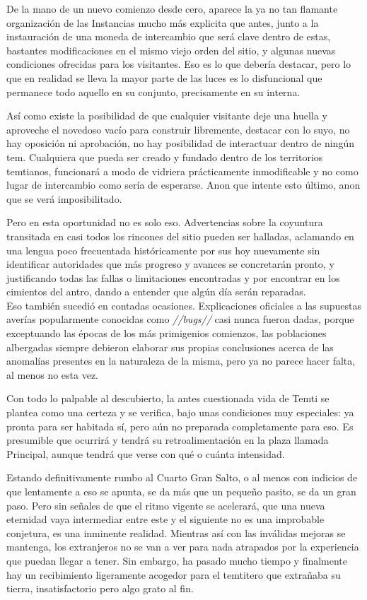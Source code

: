 \documentclass[
  spanish,
]{book}
\begin{document}
De la mano de un nuevo comienzo desde cero, aparece la ya no tan flamante organización de las Instancias mucho más explicita que antes, junto a la instauración de una moneda de intercambio que será clave dentro de estas, bastantes modificaciones en el mismo viejo orden del sitio, y algunas nuevas condiciones ofrecidas para los visitantes. Eso es lo que debería destacar, pero lo que en realidad se lleva la mayor parte de las luces es lo disfuncional que permanece todo aquello en su conjunto, precisamente en su interna.

Así como existe la posibilidad de que cualquier visitante deje una huella y aproveche el novedoso vacío para construir libremente, destacar con lo suyo, no hay oposición ni aprobación, no hay posibilidad de interactuar dentro de ningún tem. Cualquiera que pueda ser creado y fundado dentro de los territorios temtianos, funcionará a modo de vidriera prácticamente inmodificable y no como lugar de intercambio como sería de esperarse. Anon que intente esto último, anon que se verá imposibilitado.

Pero en esta oportunidad no es solo eso. Advertencias sobre la coyuntura transitada en casi todos los rincones del sitio pueden ser halladas, aclamando en una lengua poco frecuentada históricamente por sus hoy nuevamente sin identificar autoridades que más progreso y avances se concretarán pronto, y justificando todas las fallas o limitaciones encontradas y por encontrar en los cimientos del antro, dando a entender que algún día serán reparadas.\\
Eso también sucedió en contadas ocasiones. Explicaciones oficiales a las supuestas averías popularmente conocidas como \emph{//bugs//} casi nunca fueron dadas, porque exceptuando las épocas de los más primigenios comienzos, las poblaciones albergadas siempre debieron elaborar sus propias conclusiones acerca de las anomalías presentes en la naturaleza de la misma, pero ya no parece hacer falta, al menos no esta vez.

Con todo lo palpable al descubierto, la antes cuestionada vida de Temti se plantea como una certeza y se verifica, bajo unas condiciones muy especiales: ya pronta para ser habitada sí, pero aún no preparada completamente para eso. Es presumible que ocurrirá y tendrá su retroalimentación en la plaza llamada Principal, aunque tendrá que verse con qué o cuánta intensidad.

Estando definitivamente rumbo al Cuarto Gran Salto, o al menos con indicios de que lentamente a eso se apunta, se da más que un pequeño pasito, se da un gran paso. Pero sin señales de que el ritmo vigente se acelerará, que una nueva eternidad vaya intermediar entre este y el siguiente no es una improbable conjetura, es una inminente realidad. Mientras así con las inválidas mejoras se mantenga, los extranjeros no se van a ver para nada atrapados por la experiencia que puedan llegar a tener. Sin embargo, ha pasado mucho tiempo y finalmente hay un recibimiento ligeramente acogedor para el temtitero que extrañaba su tierra, insatisfactorio pero algo grato al fin.
\end{document}
